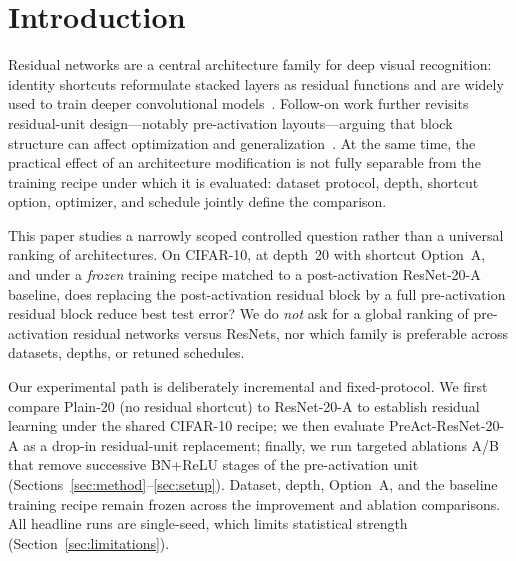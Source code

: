 \section{Introduction}
\label{sec:intro}


Residual networks are a central architecture family for deep visual recognition:
identity shortcuts reformulate stacked layers as residual functions and are widely used to
train deeper convolutional models~\citep{He2016DeepResidual}.
Follow-on work further revisits residual-unit design---notably pre-activation
layouts---arguing that block structure can affect optimization and
generalization~\citep{He2016IdentityMappings}.
At the same time, the practical effect of an architecture modification is not fully
separable from the training recipe under which it is evaluated: dataset protocol,
depth, shortcut option, optimizer, and schedule jointly define the comparison.

This paper studies a narrowly scoped controlled question rather than a universal ranking of
architectures.
On CIFAR-10, at depth~20 with shortcut Option~A, and under a \emph{frozen} training recipe
matched to a post-activation ResNet-20-A baseline, does replacing the post-activation residual
block by a full pre-activation residual block reduce best test error?
We do \emph{not} ask for a global ranking of pre-activation residual networks versus ResNets,
nor which family is preferable across datasets, depths, or retuned schedules.

Our experimental path is deliberately incremental and fixed-protocol.
We first compare Plain-20 (no residual shortcut) to ResNet-20-A to establish residual learning
under the shared CIFAR-10 recipe; we then evaluate PreAct-ResNet-20-A as a drop-in residual-unit
replacement; finally, we run targeted ablations A/B that remove successive BN+ReLU stages of
the pre-activation unit (Sections~\ref{sec:method}--\ref{sec:setup}).
Dataset, depth, Option~A, and the baseline training recipe remain frozen across the
improvement and ablation comparisons.
All headline runs are single-seed, which limits statistical strength
(Section~\ref{sec:limitations}).

